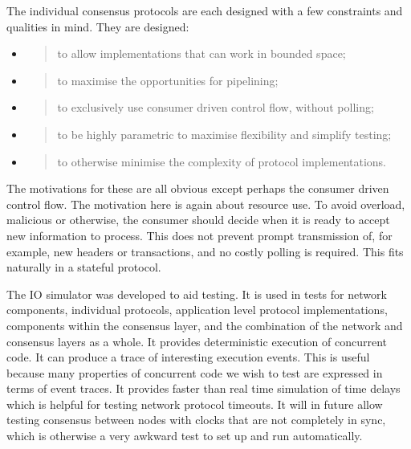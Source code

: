 \documentclass[11pt,a4paper]{article}
\begin{document}
The individual consensus protocols are each designed with a few
constraints and qualities in mind. They are designed:

\begin{itemize}
\item
  \begin{quote}
  to allow implementations that can work in bounded space;
  \end{quote}
\item
  \begin{quote}
  to maximise the opportunities for pipelining;
  \end{quote}
\item
  \begin{quote}
  to exclusively use consumer driven control flow, without polling;
  \end{quote}
\item
  \begin{quote}
  to be highly parametric to maximise flexibility and simplify testing;
  \end{quote}
\item
  \begin{quote}
  to otherwise minimise the complexity of protocol implementations.
  \end{quote}
\end{itemize}

The motivations for these are all obvious except perhaps the consumer
driven control flow. The motivation here is again about resource use. To
avoid overload, malicious or otherwise, the consumer should decide when
it is ready to accept new information to process. This does not prevent
prompt transmission of, for example, new headers or transactions, and no
costly polling is required. This fits naturally in a stateful protocol.

The IO simulator was developed to aid testing. It is used in tests for
network components, individual protocols, application level protocol
implementations, components within the consensus layer, and the
combination of the network and consensus layers as a whole. It provides
deterministic execution of concurrent code. It can produce a trace of
interesting execution events. This is useful because many properties of
concurrent code we wish to test are expressed in terms of event traces.
It provides faster than real time simulation of time delays which is
helpful for testing network protocol timeouts. It will in future allow
testing consensus between nodes with clocks that are not completely in
sync, which is otherwise a very awkward test to set up and run
automatically.
\end{document}
